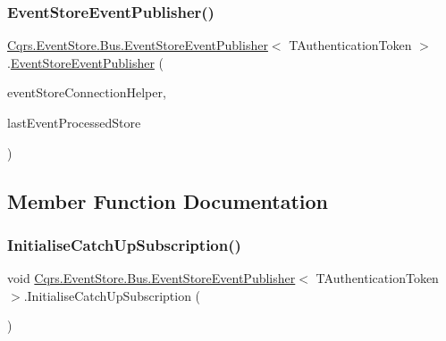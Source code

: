 \subsubsection{\texorpdfstring{Event\+Store\+Event\+Publisher()}{EventStoreEventPublisher()}}
{\footnotesize\ttfamily \hyperlink{classCqrs_1_1EventStore_1_1Bus_1_1EventStoreEventPublisher}{Cqrs.\+Event\+Store.\+Bus.\+Event\+Store\+Event\+Publisher}$<$ T\+Authentication\+Token $>$.\hyperlink{classCqrs_1_1EventStore_1_1Bus_1_1EventStoreEventPublisher}{Event\+Store\+Event\+Publisher} (\begin{DoxyParamCaption}\item[{\hyperlink{interfaceCqrs_1_1EventStore_1_1IEventStoreConnectionHelper}{I\+Event\+Store\+Connection\+Helper}}]{event\+Store\+Connection\+Helper,  }\item[{\hyperlink{interfaceCqrs_1_1Bus_1_1IStoreLastEventProcessed}{I\+Store\+Last\+Event\+Processed}}]{last\+Event\+Processed\+Store }\end{DoxyParamCaption})}



\subsection{Member Function Documentation}
\mbox{\label{classCqrs_1_1EventStore_1_1Bus_1_1EventStoreEventPublisher_a145dd61678031747b4c1768e68937181}} 
\subsubsection{\texorpdfstring{Initialise\+Catch\+Up\+Subscription()}{InitialiseCatchUpSubscription()}}
{\footnotesize\ttfamily void \hyperlink{classCqrs_1_1EventStore_1_1Bus_1_1EventStoreEventPublisher}{Cqrs.\+Event\+Store.\+Bus.\+Event\+Store\+Event\+Publisher}$<$ T\+Authentication\+Token $>$.Initialise\+Catch\+Up\+Subscription (\begin{DoxyParamCaption}{ }\end{DoxyParamCaption})\hspace{0.3cm}{\ttfamily [protected]}}

